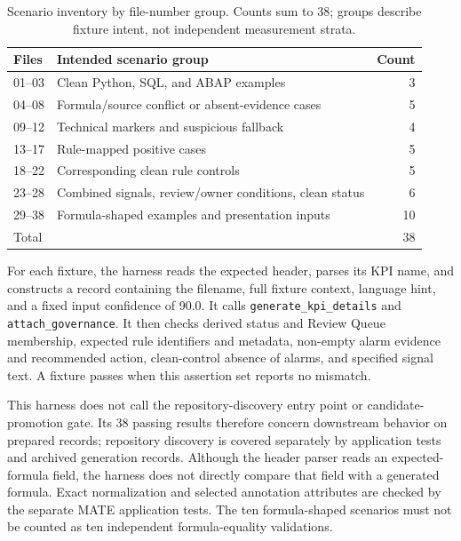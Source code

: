 \documentclass[a4paper,fleqn]{cas-dc}
\begin{document}
\begin{table}[!t]
\centering
\caption{Scenario inventory by file-number group. Counts sum to 38; groups describe fixture intent, not independent measurement strata.}
\label{tab:scenario-fixtures}
\begin{tabularx}{\columnwidth}{p{}Xr}
\toprule
\textbf{Files} & \textbf{Intended scenario group} & \textbf{Count} \\
\midrule
01--03 & Clean Python, SQL, and ABAP examples & 3 \\
04--08 & Formula/source conflict or absent-evidence cases & 5 \\
09--12 & Technical markers and suspicious fallback & 4 \\
13--17 & Rule-mapped positive cases & 5 \\
18--22 & Corresponding clean rule controls & 5 \\
23--28 & Combined signals, review/owner conditions, clean status & 6 \\
29--38 & Formula-shaped examples and presentation inputs & 10 \\
\midrule
\multicolumn{2}{l}{Total} & 38 \\
\bottomrule
\end{tabularx}
\end{table}

For each fixture, the harness reads the expected header, parses its KPI name, and constructs a record containing the filename, full fixture context, language hint, and a fixed input confidence of 90.0. It calls \texttt{generate\_kpi\_details} and \texttt{attach\_governance}. It then checks derived status and Review Queue membership, expected rule identifiers and metadata, non-empty alarm evidence and recommended action, clean-control absence of alarms, and specified signal text. A fixture passes when this assertion set reports no mismatch.

This harness does not call the repository-discovery entry point or candidate-promotion gate. Its 38 passing results therefore concern downstream behavior on prepared records; repository discovery is covered separately by application tests and archived generation records. Although the header parser reads an expected-formula field, the harness does not directly compare that field with a generated formula. Exact normalization and selected annotation attributes are checked by the separate MATE application tests. The ten formula-shaped scenarios must not be counted as ten independent formula-equality validations.
\end{document}
